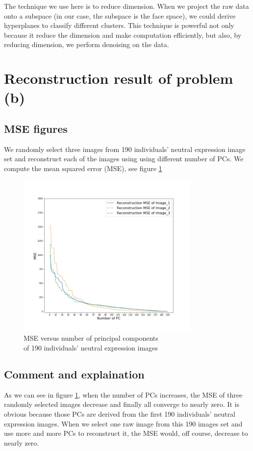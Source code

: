 \documentclass{article}
\begin{document}
The technique we use here is to reduce dimension. When we project the raw data onto a subspace (in our case, the subspace
is the face space), we could derive hyperplanes to classify different clusters. This technique is powerful not only because
it reduce the dimension and make computation efficiently, but also, by reducing dimension, we perform denoising on the data.

\section{Reconstruction result of problem (b)}

\subsection{MSE figures}
We randomly select three images from 190 individuals’ neutral expression image set and reconstruct each
of the images using using different number of PCs. We compute the mean squared error (MSE), see figure
\ref{fig:fig2}
\begin{figure}[h]
  \centering
  \includegraphics[width=0.8\textwidth]{../image/mse_neutral.jpg}
  \caption{MSE versus number of principal components\\ of 190 individuals’ neutral expression images}
  \label{fig:fig2}
\end{figure}

\subsection{Comment and explaination}
As we can see in figure \ref{fig:fig2}, when the number of PCs increases, the MSE of three randomly selected
images decrease and finally all converge to nearly zero. It is obvious because those PCs are derived from the
first 190 individuals’ neutral expression images. When we select one raw image from this 190 images set and use
more and more PCs to reconstruct it, the MSE would, off course, decrease to nearly zero.
\end{document}
